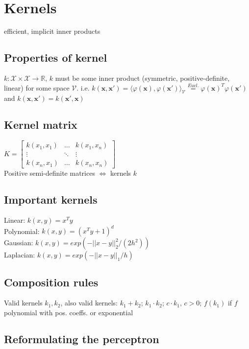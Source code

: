 \section*{Kernels}

efficient, implicit inner products

\subsection*{Properties of kernel}
$k: \mathcal{X} \times \mathcal{X} \rightarrow \mathbb{R}$, $k$ must be some inner product (symmetric, positive-definite, linear) for some space $\mathcal{V}$.
i.e. $k(\mathbf{x}, \mathbf{x'}) = \langle \varphi(\mathbf{x}), \varphi(\mathbf{x'}) \rangle_\mathcal{V} \overset{Eucl.}{=} \varphi(\mathbf{x})^T \varphi(\mathbf{x'}) $
and $k(\mathbf{x}, \mathbf{x}') = k(\mathbf{x}', \mathbf{x})$

\subsection*{Kernel matrix}
$K = 
\begin{bmatrix}
	k(x_1,x_1) & \dots & k(x_1,x_n) \\
	\vdots & \ddots & \vdots \\
	k(x_n, x_1) & \dots & k(x_n,x_n)
\end{bmatrix}$\\
Positive semi-definite matrices $\Leftrightarrow$ kernels $k$

\subsection*{Important kernels}
Linear: $k(x,y)=x^T y$\\
Polynomial: $k(x,y)=(x^T y + 1)^d$\\
Gaussian: $k(x,y) = exp(-||x-y||_2^2/(2h^2))$\\
Laplacian: $k(x,y) = exp(-||x-y||_1/h)$

\subsection*{Composition rules}
Valid kernels $k_1, k_2$, also valid kernels:
$k_1 + k_2$; $k_1 \cdot k_2$; $c \cdot k_1$, $c>0$;
$f(k_1)$ if $f$ polynomial with pos. coeffs. or exponential

\subsection*{Reformulating the perceptron}

